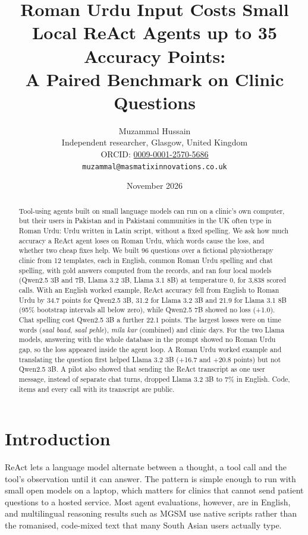 \documentclass[11pt]{article}
\title{Roman Urdu Input Costs Small Local ReAct Agents up to 35 Accuracy Points:\\A Paired Benchmark on Clinic Questions}
\author{Muzammal Hussain\\Independent researcher, Glasgow, United Kingdom\\ORCID: \href{https://orcid.org/0009-0001-2570-5686}{0009-0001-2570-5686}\\\texttt{muzammal@masmatixinnovations.co.uk}}
\date{November 2026}
\begin{document}
\maketitle

\begin{abstract}
Tool-using agents built on small language models can run on a clinic's own computer, but their users in Pakistan and in Pakistani communities in the UK often type in Roman Urdu: Urdu written in Latin script, without a fixed spelling. We ask how much accuracy a ReAct agent loses on Roman Urdu, which words cause the loss, and whether two cheap fixes help. We built 96 questions over a fictional physiotherapy clinic from 12 templates, each in English, common Roman Urdu spelling and chat spelling, with gold answers computed from the records, and ran four local models (Qwen2.5 3B and 7B, Llama 3.2 3B, Llama 3.1 8B) at temperature 0, for 3,838 scored calls. With an English worked example, ReAct accuracy fell from English to Roman Urdu by 34.7 points for Qwen2.5 3B, 31.2 for Llama 3.2 3B and 21.9 for Llama 3.1 8B (95\% bootstrap intervals all below zero), while Qwen2.5 7B showed no loss (+1.0). Chat spelling cost Qwen2.5 3B a further 22.1 points. The largest losses were on time words (\emph{saal baad}, \emph{saal pehle}), \emph{mila kar} (combined) and clinic days. For the two Llama models, answering with the whole database in the prompt showed no Roman Urdu gap, so the loss appeared inside the agent loop. A Roman Urdu worked example and translating the question first helped Llama 3.2 3B (+16.7 and +20.8 points) but not Qwen2.5 3B. A pilot also showed that sending the ReAct transcript as one user message, instead of separate chat turns, dropped Llama 3.2 3B to 7\% in English. Code, items and every call with its transcript are public.
\end{abstract}

\section{Introduction}
ReAct \citep{yao2023react} lets a language model alternate between a thought, a tool call and the tool's observation until it can answer. The pattern is simple enough to run with small open models on a laptop, which matters for clinics that cannot send patient questions to a hosted service. Most agent evaluations, however, are in English, and multilingual reasoning results such as MGSM \citep{shi2023mgsm} use native scripts rather than the romanised, code-mixed text that many South Asian users actually type.
\end{document}
